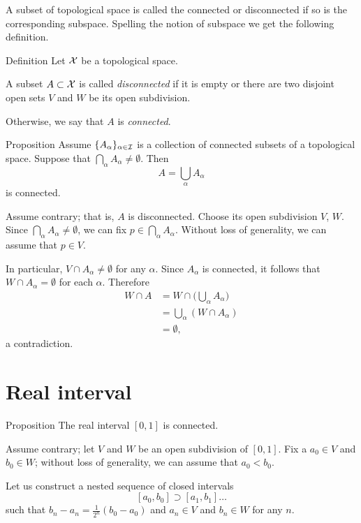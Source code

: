A subset of topological space is called the connected or disconnected if so is the corresponding subspace.
Spelling the notion of subspace we get the following definition.


\begin{thm}{Definition}
Let $\mathcal{X}$ be a topological space.

A subset $A\subset \mathcal{X}$ is called \emph{disconnected} if it is empty or there are two disjoint open sets $V$ and $W$ be its open subdivision.

Otherwise, we say that $A$ is \emph{connected}.
\end{thm}

\begin{thm}{Proposition}\label{prop:union-connect}
Assume $\{A_\alpha\}_{\alpha\in\mathcal{I}}$ is a collection of connected subsets of a topological space.
Suppose that  $\bigcap_\alpha A_\alpha\ne\emptyset$.
Then 
\[A=\bigcup_\alpha A_\alpha\] 
is connected.
\end{thm}

Assume contrary; that is, $A$ is disconnected.
Choose its open subdivision $V$, $W$.
Since $\bigcap_\alpha A_\alpha\ne\emptyset$, we can fix $p\in \bigcap_\alpha A_\alpha$.
Without loss of generality, we can assume that $p\in V$.

In particular, $V\cap A_\alpha\ne\emptyset$ for any $\alpha$.
Since $A_\alpha$ is connected, it follows that $W\cap A_\alpha=\emptyset $ for each $\alpha$.
Therefore 
\begin{align*}
W\cap A&=W\cap\biggl(\bigcup_\alpha A_\alpha\biggr)
\\&=\bigcup_\alpha(W\cap A_\alpha)
\\&=\emptyset,
\end{align*}
a contradiction.
\qeds

\section{Real interval}

\begin{thm}{Proposition}\label{prop:connected[0,1]}
The real interval $[0,1]$ is connected.
\end{thm}

Assume contrary;
let $V$ and $W$ be an open subdivision of $[0,1]$.
Fix a $a_0\in V$ and $b_0\in W$;
without loss of generality, we can assume that $a_0<b_0$.

Let us construct a nested sequence of closed intervals 
\[[a_0,b_0]\supset [a_1,b_1]\dots\]
such that $b_n-a_n=\tfrac1{2^n}(b_0-a_0)$ and $a_n\in V$ and $b_n\in W$ for any $n$.

